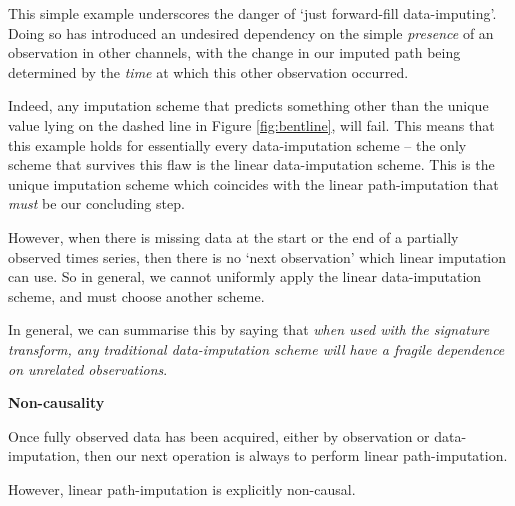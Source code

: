 \documentclass{article}
\renewcommand{\subsubsection}[1]{\textbf{#1}

} %
\begin{document}
This simple example underscores the danger of `just forward-fill data-imputing'. Doing so has introduced an undesired dependency on the simple \emph{presence} of an observation in other channels, with the change in our imputed path being determined by the \emph{time} at which this other observation occurred.

Indeed, any imputation scheme that predicts something other than the unique value lying on the dashed line in Figure \ref{fig:bentline}, will fail. This means that this example holds for essentially every data-imputation scheme -- the only scheme that survives this flaw is the linear data-imputation scheme. This is the unique imputation scheme which coincides with the linear path-imputation that \emph{must} be our concluding step.


However, when there is missing data at the start or the end of a partially observed times series, then there is no `next observation' which linear imputation can use. So in general, we cannot uniformly apply the linear data-imputation scheme, and must choose another scheme.

In general, we can summarise this by saying that \emph{when used with the signature transform, any traditional data-imputation scheme will have a fragile dependence on unrelated observations}.

\subsubsection{Non-causality}
Once fully observed data has been acquired, either by observation or data-imputation, then our next operation is always to perform linear path-imputation.

However, linear path-imputation is explicitly non-causal.
\end{document}
